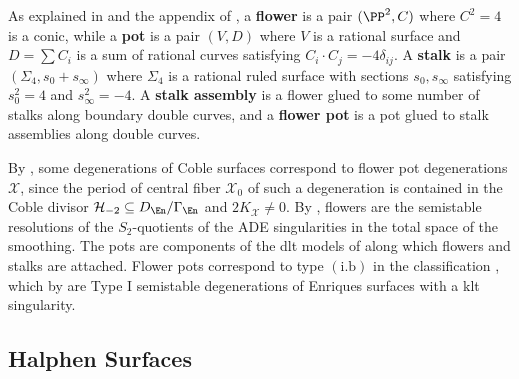 \documentclass[../../main.tex]{subfiles}
\begin{document}
\begin{remark}
As explained in \cite{Mor81} and the appendix of \cite{Sha81}, a \textbf{flower} is a pair $(\PP^2, C)$ where $C^2 = 4$ is a conic, while a \textbf{pot} is a pair $(V, D)$ where $V$ is a rational surface and $D = \sum C_i$ is a sum of rational curves satisfying $C_i\cdot C_j = -4\delta_{ij}$. A \textbf{stalk} is a pair $(\Sigma_4, s_0 + s_\infty)$ where $\Sigma_4$ is a rational ruled surface with sections $s_0, s_\infty$ satisfying $s_0^2 = 4$ and $s_\infty^2 = -4$. A \textbf{stalk assembly} is a flower glued to some number of stalks along boundary double curves, and a \textbf{flower pot} is a pot glued to stalk assemblies along double curves.

By \cite[Lem. 7.1, 7.2]{Mor81}, some degenerations of Coble surfaces correspond to flower pot degenerations $\mathcal{X}$, since the period of central fiber $\mathcal{X}_0$ of such a degeneration is contained in the Coble divisor $\mathcal{H}_{-2} \subseteq D_\En/\Gamma_{\En}$ and $2K_{\mathcal{X}}\neq 0$. By \cite{AEGS23}, flowers are the semistable resolutions of the $S_2$-quotients of the ADE singularities in the total space of the smoothing. The pots are components of the dlt models of \cite{AEGS23} along which flowers and stalks are attached. Flower pots correspond to type $\mathrm{(i.b)}$ in the classification \cite[Cor. 6.2]{Mor81}, which by \cite[Rmk. 4.12]{AEGS23} are Type $\mathrm{I}$ semistable degenerations of Enriques surfaces with a klt singularity.
\end{remark}

\subsection{Halphen Surfaces}
\end{document}
